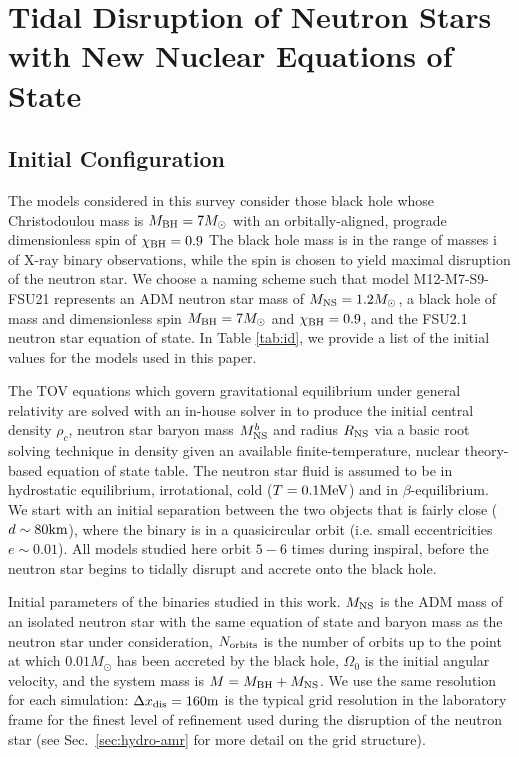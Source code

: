 \chapter{Tidal Disruption of Neutron Stars with New Nuclear Equations of State}
\label{chap:chapter-5}

\section{Initial Configuration}
\label{sec:initial-config}

The models considered in this survey consider those black hole whose Christodoulou mass is $M_{\rm BH} = 7 M_\odot$ with an orbitally-aligned, prograde dimensionless spin of $\chi_{\rm BH} = 0.9$  The black hole mass is in the range of masses i of X-ray binary observations, while the spin is chosen to yield maximal disruption of the neutron star.  We choose a naming scheme such that model M12-M7-S9-FSU21 represents an ADM neutron star mass of $M_{\rm NS} = 1.2 M_\odot$, a black hole of mass and dimensionless spin $M_{\rm BH} = 7 M_\odot$ and $\chi_{\rm BH} = 0.9$, and the FSU2.1 neutron star equation of state.  In Table \ref{tab:id}, we provide a list of the initial values for the models used in this paper.

The TOV equations which govern gravitational equilibrium under general relativity are solved with an in-house solver in \SpEC to produce the initial central density $\rho_c$, neutron star baryon mass $M^b_{\rm NS}$ and radius $R_{\rm NS}$ via a basic root solving technique in density given an available finite-temperature, nuclear theory-based equation of state table.  
The neutron star fluid is assumed to be in hydrostatic equilibrium, irrotational, cold ($T = 0.1 {\rm MeV}$) and in $\beta$-equilibrium.
We start with an initial separation between the two objects that is fairly close ($d \sim 80 {\rm km}$), where the binary is in a quasicircular orbit
(i.e. small eccentricities $e \sim 0.01$).
All models studied here orbit $5 - 6$ times during inspiral, before the neutron star begins to tidally disrupt and accrete onto the black hole.

\begin{table}
	\begin{center}
	\caption[Initial parameters of binaries used in this survey]{
		Initial parameters of the binaries studied in this work. 
		$M_{\rm NS}$ is the ADM mass of an isolated neutron star with the same equation of state and baryon mass as the neutron star under
		consideration, $N_{\rm orbits}$ is the number of orbits up to the point at which $0.01M_\odot$ has been accreted by the black hole,
		$\Omega_0$ is the initial angular velocity, and the system mass is $M=M_{\rm BH}+M_{\rm NS}$. We use the same resolution for each simulation: $\Delta x_{\rm dis} = 160{\rm m}$ is the typical grid resolution in the laboratory frame
		for the finest level of refinement used during the disruption of the neutron star (see Sec.~\ref{sec:hydro-amr} for more detail on the grid structure).}
	\label{tab:id}
	{
		
	}
	\end{center}
\end{table}


